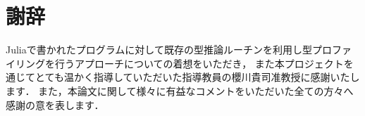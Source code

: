 
\section*{謝辞}

Juliaで書かれたプログラムに対して既存の型推論ルーチンを利用し型プロファイリングを行うアプローチについての着想をいただき，
また本プロジェクトを通じてとても温かく指導していただいた指導教員の櫻川貴司准教授に感謝いたします．
また，本論文に関して様々に有益なコメントをいただいた全ての方々へ感謝の意を表します．
